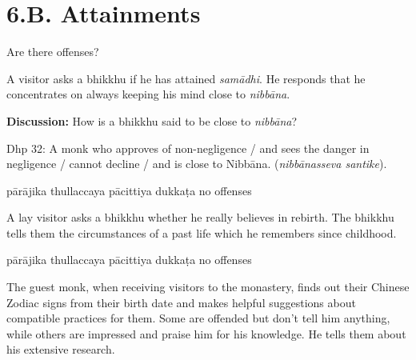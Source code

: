 \chapter{6.B. Attainments}
\renewcommand*{\theChapterTitle}{6.B. Attainments}

\begin{exam}{\autoExamName}

\begin{problem*}

  Are there offenses?

\begin{parts}

  \item A visitor asks a bhikkhu if he has attained \emph{samādhi}.
  He responds that he concentrates on always keeping his mind close to \emph{nibbāna}.

  \textbf{Discussion:} How is a bhikkhu said to be close to \emph{nibbāna}?

  \begin{solution}
    Dhp 32: A monk who approves of non-negligence / and sees the danger in negligence / cannot decline / and is close to Nibbāna. (\emph{nibbānasseva santike}).
  \end{solution}

  \bigskip

  \begin{answers}{5}
    \bChoices
     pārājika\eAns
     thullaccaya\eAns
     pācittiya\eAns
     dukkaṭa\eAns
     no offenses\eAns
    \eChoices
  \end{answers}

  \bigskip

  \item A lay visitor asks a bhikkhu whether he really believes in rebirth. The bhikkhu tells them the circumstances of a past life which he remembers since childhood.

  \bigskip

  \begin{answers}{5}
    \bChoices
     pārājika\eAns
     thullaccaya\eAns
     pācittiya\eAns
     dukkaṭa\eAns
     no offenses\eAns
    \eChoices
  \end{answers}

  \bigskip

  \item The guest monk, when receiving visitors to the monastery, finds out
  their Chinese Zodiac signs from their birth date and makes helpful suggestions
  about compatible practices for them. Some are offended but don't tell him
  anything, while others are impressed and praise him for his knowledge. He
  tells them about his extensive research.


\end{parts}
\end{problem*}
\end{exam}

